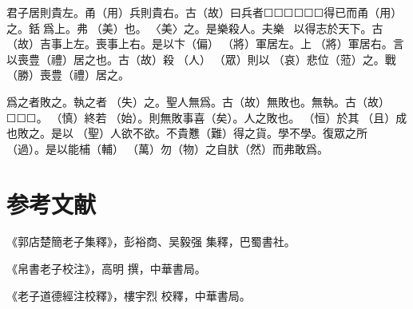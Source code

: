 \documentclass[a4paper]{ctexart}
\begin{document}
    君子居則貴左。甬（用）兵則貴右。古（故）曰兵者☐☐☐☐☐☐得已而甬（用）之。銛󶵩爲上。弗󶴴（美）也。󶵪〈美〉之。是樂殺人。夫樂☐☐☐以得志於天下。古（故）吉事上左。喪事上右。是以卞（偏）𨟻（將）軍居左。上𨟻（將）軍居右。言以喪豊（禮）居之也。古（故）殺☐（人）☐（眾）則以𢙇（哀）悲位（蒞）之。戰󼡲（勝）喪豊（禮）居之。

    爲之者敗之。執之者󶴡（失）之。聖人無爲。古（故）無敗也。無執。古（故）☐☐☐。󶴤（慎）終若󶴪（始）。則無敗事喜（矣）。人之敗也。𠄨（恒）於其𠭯（且）成也敗之。是以☐（聖）人欲不欲。不貴戁（難）得之貨。學不學。復眾之所󶴭（過）。是以能㭪（輔）󼧕（萬）勿（物）之自肰（然）而弗敢爲。

    \section*{参考文献}
    《郭店楚簡老子集釋》，彭裕商、吴毅强 集釋，巴蜀書社。

    《帛書老子校注》，高明 撰，中華書局。

    《老子道德經注校釋》，樓宇烈 校釋，中華書局。
\end{document}
